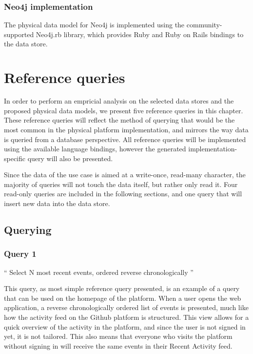 \subsubsection{Neo4j implementation}
\label{subsubsec:neo4j-implementation}

The physical data model for Neo4j is implemented using the community-supported Neo4j.rb library, which provides Ruby and Ruby on Rails bindings to the data store.

\section{Reference queries}
\label{sec:reference-queries}


In order to perform an empricial analysis on the selected data stores and the proposed physical data models, we present five reference queries in this chapter.
These reference queries will reflect the method of querying that would be the most common in the physical platform implementation, and mirrors the way data is queried from a database perspective.
All reference queries will be implemented using the available language bindings, however the generated implementation-specific query will also be presented.

Since the data of the use case is aimed at a write-once, read-many character, the majority of queries will not touch the data itself, but rather only read it.
Four read-only queries are included in the following sections, and one query that will insert new data into the data store.

\subsection{Querying}
\label{subsec:querying}

\subsubsection{Query 1}
\label{subsubsec:query-1}

``
Select N most recent events, ordered reverse chronologically
''

This query, as most simple reference query presented, is an example of a query that can be used on the homepage of the platform.
When a user opens the web application, a reverse chronologically ordered list of events is presented, much like how the activity feed on the Github platform is structured.
This view allows for a quick overview of the activity in the platform, and since the user is not signed in yet, it is not tailored.
This also means that everyone who visits the platform without signing in will receive the same events in their Recent Activity feed.

